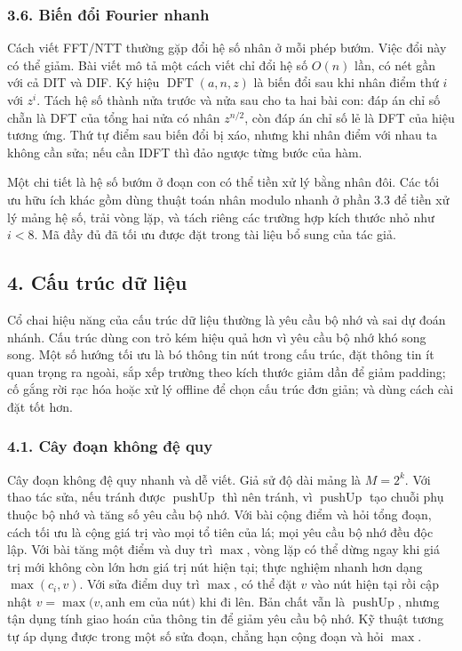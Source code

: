 \documentclass[11pt]{article}
\begin{document}
\subsubsection*{3.6. Biến đổi Fourier nhanh}

Cách viết FFT/NTT thường gặp đổi hệ số nhân ở mỗi phép bướm. Việc đổi này có
thể giảm. Bài viết mô tả một cách viết chỉ đổi hệ số \(O(n)\) lần, có nét gần
với cả DIT và DIF. Ký hiệu \(\operatorname{DFT}(a,n,z)\) là biến đổi sau khi
nhân điểm thứ \(i\) với \(z^i\). Tách hệ số thành nửa trước và nửa sau cho ta
hai bài con: đáp án chỉ số chẵn là DFT của tổng hai nửa có nhân \(z^{n/2}\),
còn đáp án chỉ số lẻ là DFT của hiệu tương ứng. Thứ tự điểm sau biến đổi bị
xáo, nhưng khi nhân điểm với nhau ta không cần sửa; nếu cần IDFT thì đảo ngược
từng bước của hàm.

Một chi tiết là hệ số bướm ở đoạn con có thể tiền xử lý bằng nhân đôi. Các tối
ưu hữu ích khác gồm dùng thuật toán nhân modulo nhanh ở phần 3.3 để tiền xử lý
mảng hệ số, trải vòng lặp, và tách riêng các trường hợp kích thước nhỏ như
\(i<8\). Mã đầy đủ đã tối ưu được đặt trong tài liệu bổ sung của tác giả.

\subsection*{4. Cấu trúc dữ liệu}

Cổ chai hiệu năng của cấu trúc dữ liệu thường là yêu cầu bộ nhớ và sai dự đoán
nhánh. Cấu trúc dùng con trỏ kém hiệu quả hơn vì yêu cầu bộ nhớ khó song song.
Một số hướng tối ưu là bó thông tin nút trong cấu trúc, đặt thông tin ít quan
trọng ra ngoài, sắp xếp trường theo kích thước giảm dần để giảm padding; cố
gắng rời rạc hóa hoặc xử lý offline để chọn cấu trúc đơn giản; và dùng cách
cài đặt tốt hơn.

\subsubsection*{4.1. Cây đoạn không đệ quy}

Cây đoạn không đệ quy nhanh và dễ viết. Giả sử độ dài mảng là \(M=2^k\). Với
thao tác sửa, nếu tránh được \(\operatorname{pushUp}\) thì nên tránh, vì
\(\operatorname{pushUp}\) tạo chuỗi phụ thuộc bộ nhớ và tăng số yêu cầu bộ nhớ.
Với bài cộng điểm và hỏi tổng đoạn, cách tối ưu là cộng giá trị vào mọi tổ tiên
của lá; mọi yêu cầu bộ nhớ đều độc lập. Với bài tăng một điểm và duy trì
\(\max\), vòng lặp có thể dừng ngay khi giá trị mới không còn lớn hơn giá trị
nút hiện tại; thực nghiệm nhanh hơn dạng \(\max(c_i,v)\). Với sửa điểm duy trì
\(\max\), có thể đặt \(v\) vào nút hiện tại rồi cập nhật \(v=\max(v,\)anh em
của nút\()\) khi đi lên. Bản chất vẫn là \(\operatorname{pushUp}\), nhưng tận
dụng tính giao hoán của thông tin để giảm yêu cầu bộ nhớ. Kỹ thuật tương tự áp
dụng được trong một số sửa đoạn, chẳng hạn cộng đoạn và hỏi \(\max\).
\end{document}
